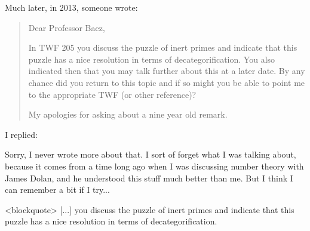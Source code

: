 Much later, in 2013, someone wrote:

\begin{quote}
Dear Professor Baez,

In TWF 205 you discuss the puzzle of inert primes and indicate that
this puzzle has a nice resolution in terms of decategorification.  You
also indicated then that you may talk further about this at a later
date.  By any chance did you return to this topic and if so might you
be able to point me to the appropriate TWF (or other reference)?

My apologies for asking about a nine year old remark.
\end{quote}
    

I replied:

Sorry, I never wrote more about that.  I sort of forget what I was
talking about, because it comes from a time long ago when I was
discussing number theory with James Dolan, and he understood this
stuff much better than me.  But I think I can remember a bit if I
try...

<blockquote> [...] you discuss the puzzle of inert primes and indicate
that this puzzle has a nice resolution in terms of decategorification.


